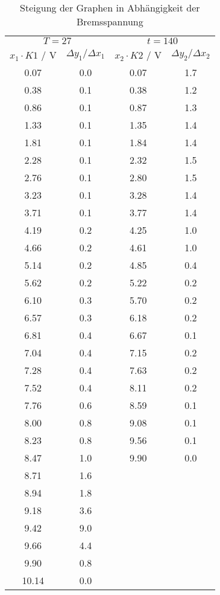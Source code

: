 \begin{table}
  \centering
  \begin{tabular}{c c|c c}
    \toprule
    	\multicolumn{2}{c}{$T = 27$} & \multicolumn{2}{c}{$t = 140$} \\
	$x_1 \cdot K1$ / V & $\Delta y_1  / \Delta x_1$ & $x_2 \cdot K2$ / V & $\Delta y_2  / \Delta x_2$ \\
    \midrule
	0.07 	& 0.0 	& 0.07 	& 1.7	\\
	0.38	& 0.1	& 0.38 	& 1.2	\\
	0.86	& 0.1	& 0.87	& 1.3	\\
	1.33	& 0.1	& 1.35	& 1.4	\\
	1.81	& 0.1	& 1.84	& 1.4	\\
	2.28	& 0.1	& 2.32	& 1.5	\\
	2.76	& 0.1	& 2.80 	& 1.5 	\\
	3.23	& 0.1	& 3.28	& 1.4	\\
	3.71	& 0.1	& 3.77	& 1.4	\\
	4.19	& 0.2	& 4.25	& 1.0	\\
      	4.66	& 0.2	& 4.61	& 1.0	\\
	5.14	& 0.2	& 4.85	& 0.4 	\\
	5.62	& 0.2	& 5.22 	& 0.2	\\
	6.10	& 0.3	& 5.70	& 0.2	\\
	6.57	& 0.3	& 6.18	& 0.2	\\
	6.81	& 0.4	& 6.67	& 0.1	\\
	7.04	& 0.4	& 7.15	& 0.2	\\
	7.28	& 0.4	& 7.63	& 0.2 	\\
	7.52	& 0.4	& 8.11	& 0.2	\\
	7.76	& 0.6	& 8.59	& 0.1	\\
	8.00	& 0.8	& 9.08	& 0.1	\\
	8.23	& 0.8	& 9.56	& 0.1	\\
	8.47	& 1.0	& 9.90	& 0.0	\\
	8.71	& 1.6	& & \\
	8.94	& 1.8	& & \\
	9.18	& 3.6	& & \\
	9.42	& 9.0	& & \\
	9.66	& 4.4	& & \\
	9.90 	& 0.8	& & \\
	10.14 	& 0.0	& & \\
    \bottomrule
  \end{tabular}
  \caption{Steigung der Graphen in Abhängigkeit der Bremsspannung}
  \label{tab:steig}
\end{table}
